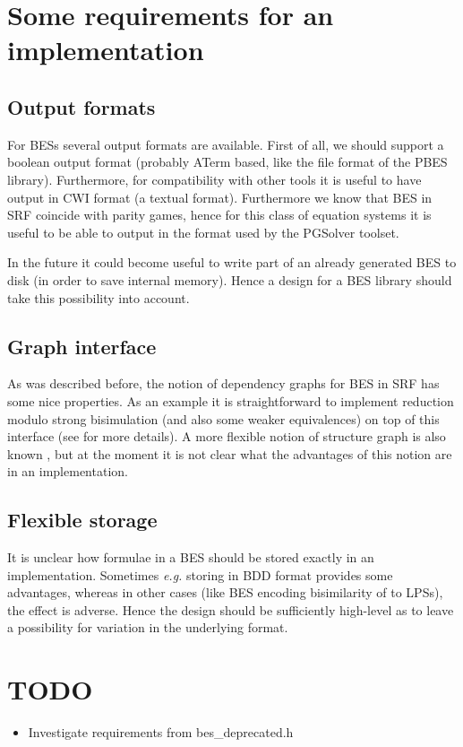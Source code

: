 \documentclass[a4paper,11pt]{article}
\newcommand{\eg}{\textit{e.g.}\xspace }
\begin{document}
\section{Some requirements for an implementation}

\subsection{Output formats}
For BESs several output formats are available. First of all, we should
support a boolean output format (probably ATerm based, like the file
format of the PBES library). Furthermore, for compatibility with other
tools it is useful to have output in CWI format (a textual format).
Furthermore we know that BES in SRF coincide with parity games, hence
for this class of equation systems it is useful to be able to output
in the format used by the PGSolver toolset.

In the future it could become useful to write part of an already generated
BES to disk (in order to save internal memory). Hence a design for a BES
library should take this possibility into account.

\subsection{Graph interface}
As was described before, the notion of dependency graphs for BES
in SRF has some nice properties. As an example it is straightforward
to implement reduction modulo strong bisimulation (and also some weaker
equivalences) on top of this interface (see \cite{KeirenW2009} for more
details). A more flexible notion of structure graph is also known
\cite{ReniersW2009}, but at the moment it is not clear what the
advantages of this notion are in an implementation.

\subsection{Flexible storage}
It is unclear how formulae in a BES should be stored exactly in an
implementation. Sometimes \eg storing in BDD format provides some
advantages, whereas in other cases (like BES encoding bisimilarity of
to LPSs), the effect is adverse. Hence the design should be sufficiently
high-level as to leave a possibility for variation in the underlying format.

\section{TODO}
\begin{itemize}
\item Investigate requirements from bes\_deprecated.h
\end{itemize}
\end{document}
